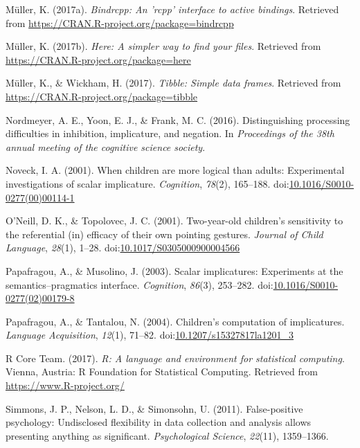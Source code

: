\documentclass[man]{apa6}
\theoremstyle{definition}
\theoremstyle{definition}
\theoremstyle{definition}
\theoremstyle{remark}
\begin{document}
\hypertarget{ref-R-bindrcpp}{}
Müller, K. (2017a). \emph{Bindrcpp: An 'rcpp' interface to active
bindings}. Retrieved from
\url{https://CRAN.R-project.org/package=bindrcpp}

\hypertarget{ref-R-here}{}
Müller, K. (2017b). \emph{Here: A simpler way to find your files}.
Retrieved from \url{https://CRAN.R-project.org/package=here}

\hypertarget{ref-R-tibble}{}
Müller, K., \& Wickham, H. (2017). \emph{Tibble: Simple data frames}.
Retrieved from \url{https://CRAN.R-project.org/package=tibble}

\hypertarget{ref-nordmeyer2016}{}
Nordmeyer, A. E., Yoon, E. J., \& Frank, M. C. (2016). Distinguishing
processing difficulties in inhibition, implicature, and negation. In
\emph{Proceedings of the 38th annual meeting of the cognitive science
society}.

\hypertarget{ref-noveck2001}{}
Noveck, I. A. (2001). When children are more logical than adults:
Experimental investigations of scalar implicature. \emph{Cognition},
\emph{78}(2), 165--188.
doi:\href{https://doi.org/10.1016/S0010-0277(00)00114-1}{10.1016/S0010-0277(00)00114-1}

\hypertarget{ref-oneill2001}{}
O'Neill, D. K., \& Topolovec, J. C. (2001). Two-year-old children's
sensitivity to the referential (in) efficacy of their own pointing
gestures. \emph{Journal of Child Language}, \emph{28}(1), 1--28.
doi:\href{https://doi.org/10.1017/S0305000900004566}{10.1017/S0305000900004566}

\hypertarget{ref-papafragou2003}{}
Papafragou, A., \& Musolino, J. (2003). Scalar implicatures: Experiments
at the semantics--pragmatics interface. \emph{Cognition}, \emph{86}(3),
253--282.
doi:\href{https://doi.org/10.1016/S0010-0277(02)00179-8}{10.1016/S0010-0277(02)00179-8}

\hypertarget{ref-papafragou2004}{}
Papafragou, A., \& Tantalou, N. (2004). Children's computation of
implicatures. \emph{Language Acquisition}, \emph{12}(1), 71--82.
doi:\href{https://doi.org/10.1207/s15327817la1201_3}{10.1207/s15327817la1201\_3}

\hypertarget{ref-R-base}{}
R Core Team. (2017). \emph{R: A language and environment for statistical
computing}. Vienna, Austria: R Foundation for Statistical Computing.
Retrieved from \url{https://www.R-project.org/}

\hypertarget{ref-simmons2011false}{}
Simmons, J. P., Nelson, L. D., \& Simonsohn, U. (2011). False-positive
psychology: Undisclosed flexibility in data collection and analysis
allows presenting anything as significant. \emph{Psychological Science},
\emph{22}(11), 1359--1366.
\end{document}

